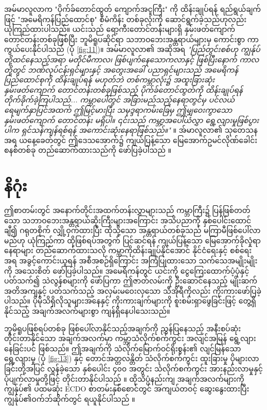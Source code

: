 \documentclass[10pt,twocolumn,letterpaper]{article}
\begin{document}
အမ်မာလူလာက "ပိုက်ခ်တောင်ထွတ် ကျောက်အငူကြီး" ကို ထိန်းချုပ်ရန် ရည်ရွယ်ချက်ဖြင့် "အမေရိကန်ပြည်ထောင်စု" စီမံကိန်း တစ်ခုလုံးကို ဆောင်ရွက်ခဲ့သည်ဟုလည်း ယုံကြည်ထားပါသည်။ ယင်းသည် ရော့ကီးတောင်တန်းများရှိ နှမ်းဖတ်ကျောက် တောင်တန်းတစ်ခုဖြစ်ပြီး ဘူမိရူပဆိုင်ရာ သဘာဝဘေးအန္တရာယ်များမှ ကောင်းစွာ ကာကွယ်ပေးနိုင်ပါသည် (ပုံ \ref{fig:11})။ အမ်မာလူလာ၏ အဆိုအရ \textit{"ပြည်တွင်းစစ်ဟု ကျွန်ုပ်တို့ထင်နေသည့်အရာ မတိုင်မီကာလ၊ ဖြစ်ပျက်နေသောကလာနှင့် ဖြစ်ပြီးနောက် ကာလတို့တွင် ဘဏ်လုပ်ငန်းရှင်များနှင့် အတွေးအခေါ် ပညာရှင်များသည် အမေရိကန်ပြည်ထောင်စုကို ထိန်းချုပ်ရန် မဟုတ်ဘဲ တစ်ကမ္ဘာလုံး၌ အထူးခြားဆုံး နှမ်းဖတ်ကျောက် တောင်တန်းတစ်ခုဖြစ်သည့် ပိုက်ခ်တောင်ထွတ်ကို ထိန်းချုပ်ရန် တိုက်ခိုက်ခဲ့ကြပါသည်... ကမ္ဘာပေါ်တွင် အခြားမည်သည့်နေရာတွင်မှ ပင်လယ်ရေမျက်နှာပြင်အထက် ဤမြင့်မားပြီး သမုဒ္ဒရာကမ်းခြေမှ ဤမျှဝေးကွာသော နှမ်းဖတ်ကျောက် တောင်တန်း မရှိပါ။ ၎င်းသည် ကမ္ဘာ့အပေါ်ယံလွှာ ရွေ့လျားမှုဖြစ်ပွားပါက ရှင်သန်ကျန်ရစ်ရန် အကောင်းဆုံးနေရာဖြစ်သည်။"} \cite{33,34}။ အ်မာလူလာ၏ သုတေသနအရ ယနေ့ခေတ်တွင် ဤဒေသအောက်၌ ကျယ်ပြန့်သော မြေအောက်ဥမင်လိုဏ်ခေါင်းစနစ်တစ်ခု တည်ဆောက်ထားသည်ကို ဖော်ပြခဲ့ပါသည် \cite{36}။

\section{နိဂုံး}

ဤစာတမ်းတွင် အနောက်တိုင်းအထက်တန်းလွှာများသည် ကမ္ဘာကြီး၌ ပြန်ဖြစ်တတ်သော သဘာဝဘေးအန္တရာယ်ဆိုးကြီးများအကြောင်း အသိပညာကို နှစ်ပေါင်းထောင်ချီ၍ ဂရုတစိုက် လျှို့ဝှက်ထားပြီး ထိုသို့သော အန္တရာယ်တစ်ခုသည် မကြာမီဖြစ်ပေါ်လာမည်ဟု ယုံကြည်ကာ ထိုဖြစ်ရပ်အတွက် ပြင်ဆင်ရန် ကျယ်ပြန့်သော မြေအောက်ခိုလှုံရာနေရာများ တည်ဆောက်ထားသလို ကမ္ဘာကိုထိန်းချုပ်နိုင်အောင် နိုင်ငံရေးနှင့် စစ်ရေးအရ အခွင့်ကောင်းယူရန် အစီအစဉ်ရှိကြောင်း အကြံပြုထားသော သက်သေအမျိုးမျိုးကို အသေးစိတ် ဖော်ပြခဲ့ပါသည်။ အမေရိကန်တွင် ယင်းကို ငွေကြေးထောက်ပံ့ပုံနှင့် ပတ်သက်၍ သဲလွန်စများကို ဖော်ပြကာ ဤဇာတ်လမ်းကို ဦးဆောင်နေသည့် မျိုးဆက် အတိအကျနှင့် ပတ်သက်သည့် အလှမ်းမဝေးလှသော သီအိုရီကိုလည်း ကိုးကားဖော်ပြခဲ့ပါသည်။ ပိုမိုသိရှိလိုသူများအနေနှင့် ကိုးကားချက်များကို စူးစမ်းရှာဖွေခြင်းဖြင့် တွေ့ရှိနိုင်သည့် အချက်အလက်များစွာ ကျန်ရှိနေပါသေးသည်။

ဘူမိရူပဖြစ်ရပ်တစ်ခု ဖြစ်ပေါ်လာနိုင်သည့်အချက်ကို ညွှန်ပြနေသည့် အနီးစပ်ဆုံး တိုင်းတာနိုင်သော အချက်အလက်မှာ ကမ္ဘာ့သံလိုက်စက်ကွင်း အလျင်အမြန် ရွေ့လျားနေခြင်းပင် ဖြစ်သည်။ ဤအချက်ကို သံလိုက်မြောက်ဝင်ရိုးစွန်း၏ လျင်မြန်သောရွေ့လျားမှု (ပုံ \ref{fig:13}) နှင့် တောင်အတ္တလန္တိတ် သံလိုက်စက်ကွင်း ထူးခြားမှု ပိုများလာခြင်းတို့အပြင် လွန်ခဲ့သော နှစ်ပေါင်း ၄၀၀ အတွင်း သံလိုက်စက်ကွင်း အားနည်းလာမှုနှင့် ပုံပျက်လာမှုတို့ဖြင့် တိုင်းတာနိုင်ပါသည် \cite{3}။ ထိုသိပ္ပံနည်းကျ အချက်အလက်များကို ကျွန်ုပ်၏ ပထမဆုံး ECDO စာတမ်းနှစ်စောင်တွင် အကျယ်တဝင့် ဆွေးနွေးထားပြီး ကျွန်ုပ်၏ဝက်ဘ်ဆိုက်တွင် ရယူနိုင်ပါသည် \cite{3}။
\end{document}
